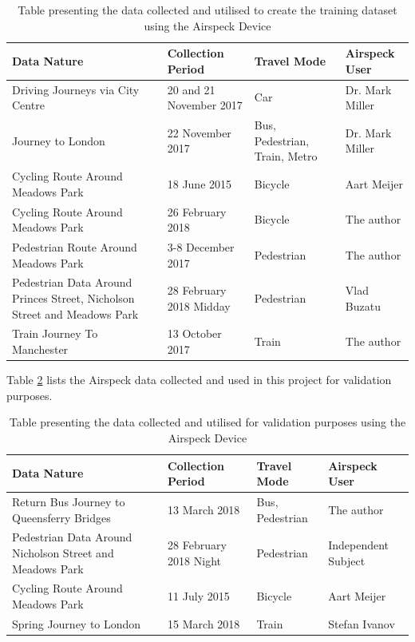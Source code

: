 \documentclass[bsc,frontabs,twoside,singlespacing, parskip,deptreport]{infthesis}     %
\begin{document}
\begin{table}[h!]
\centering
 \begin{tabular}{|| p{} | p{} | p{} | p{} ||} 
 \hline
 Data Nature & Collection Period & Travel Mode & Airspeck User\\ [0.5ex] 
 \hline\hline
 Driving Journeys via City Centre & 20 and 21 November 2017 & Car & Dr. Mark Miller \\ 
 \hline
 Journey to London & 22 November 2017 &  Bus, Pedestrian, Train, Metro & Dr. Mark Miller \\
 \hline
 Cycling Route Around Meadows Park &  18 June 2015 & Bicycle & Aart Meijer \\
  \hline
 Cycling Route Around Meadows Park & 26 February 2018 & Bicycle & The author \\
  \hline
 Pedestrian Route Around Meadows Park & 3-8 December 2017 & Pedestrian & The author \\
 \hline
 Pedestrian Data Around Princes Street, Nicholson Street and Meadows Park & 28 February 2018 Midday & Pedestrian & Vlad Buzatu \\
 \hline
 Train Journey To Manchester & 13 October 2017 & Train & The author \\
 \hline
 \end{tabular}
\caption{Table presenting the data collected and utilised to create the training dataset using the Airspeck Device}
\label{table:training-datasets}
\end{table}

Table \ref{table:validation-datasets} lists the Airspeck data collected  and used in this project for validation purposes.

\begin{table}[h!]
\centering
 \begin{tabular}{|| p{} | p{} | p{} | p{} ||} 
 \hline
 Data Nature & Collection Period & Travel Mode & Airspeck User\\ [0.5ex] 
 \hline\hline
 Return Bus Journey to Queensferry Bridges & 13 March 2018 & Bus, Pedestrian & The author \\ 
 \hline
 Pedestrian Data Around Nicholson Street and Meadows Park & 28 February 2018 Night & Pedestrian & Independent Subject \\
 \hline
 Cycling Route Around Meadows Park &  11 July 2015 & Bicycle & Aart Meijer \\
  \hline
 Spring Journey to London & 15 March 2018 & Train & Stefan Ivanov \\
 \hline
 \end{tabular}
\caption{Table presenting the data collected and utilised for validation purposes using the Airspeck Device}
\label{table:validation-datasets}
\end{table}
\end{document}
